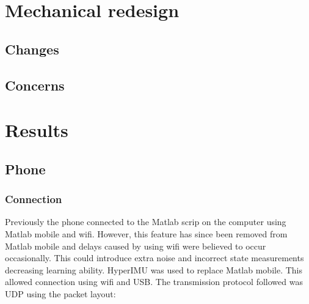 \documentclass[twoside,twocolumn,12pt]{article}
\begin{document}
\section{Mechanical redesign}


\subsection{Changes}

\subsection{Concerns}

\clearpage
\section{Results}
\subsection{Phone}
\subsubsection{Connection}
Previously the phone connected to the Matlab scrip on the computer using Matlab mobile and wifi. However, this feature has since been removed from Matlab mobile and delays caused by using wifi were believed to occur occasionally. This could introduce extra noise and incorrect state measurements decreasing learning ability.
\newline
HyperIMU \cite{ianovir} was used to replace Matlab mobile. This allowed connection using wifi and USB. The transmission protocol followed was UDP using the packet layout:
\end{document}
